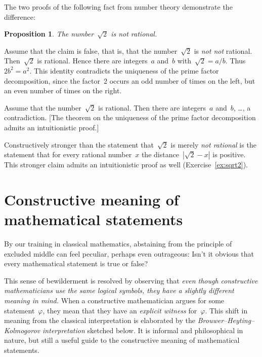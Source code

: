 \documentclass[10pt,reqno,a4paper,openany]{amsbook}
\makeatletter
\theoremstyle{definition}
\theoremstyle{plain}
\newtheorem{prop}[defn]{Proposition}
\theoremstyle{remark}
\newcommand{\?}{\,{:}\,}
\renewcommand{\_}{\mathpunct{.}\,}
\renewenvironment{proof}[1][\proofname]{\par
  \pushQED{\qed}%
  \normalfont \topsep6\p@\@plus6\p@\relax
  \trivlist
  \item[\hskip\labelsep
        \itshape
    #1\@addpunct{.}]\ignorespaces
}{%
  \popQED\endtrivlist\@endpefalse
}
\makeatother
\begin{document}
The two proofs of the following fact from number theory demonstrate the
difference:
\begin{prop}\label{prop:sqrt2}The number~$\sqrt{2}$ is not rational.\end{prop}
\begin{proof}[Proof (only valid classically)]
Assume that the claim is false, that is, that the number~$\sqrt{2}$ is
\emph{not not} rational. Then~$\sqrt{2}$ is rational. Hence there are
integers~$a$ and~$b$ with~$\sqrt{2} = a / b$. Thus~$2b^2 = a^2$. This identity
contradicts the uniqueness of the prime factor decomposition, since the
factor~$2$ occurs an odd number of times on the left, but an even number of
times on the right.
\end{proof}
\begin{proof}[Proof (also valid intuitionistically)]
Assume that the number~$\sqrt{2}$ is rational. Then there are integers~$a$
and~$b$, \ldots, a contradiction.
[The theorem on the uniqueness of the prime factor decomposition admits an
intuitionistic proof.]
\end{proof}

Constructively stronger than the statement that~$\sqrt{2}$ is merely
\emph{not rational} is the statement that for every rational number~$x$
the distance~$|\sqrt{2} - x|$ is positive. This stronger claim admits an
intuitionistic proof as well (Exercise~\ref{ex:sqrt2}).


\section{Constructive meaning of mathematical statements}

By our training in classical mathematics, abstaining from the principle of
excluded middle can feel peculiar, perhaps even outrageous: Isn't it obvious
that every mathematical statement is true or false?

This sense of bewilderment is resolved by observing that \emph{even though
constructive mathematicians use the same logical symbols, they have a slightly
different meaning in mind.} When a constructive mathematician argues for some
statement~$\varphi$, they mean that they have an \emph{explicit witness}
for~$\varphi$. This shift in meaning from the classical interpretation is
elaborated by the \emph{Brouwer--Heyting--Kolmogorov interpretation} sketched
below. It is informal and philosophical in nature, but still a useful guide to
the constructive meaning of mathematical statements.
\end{document}
